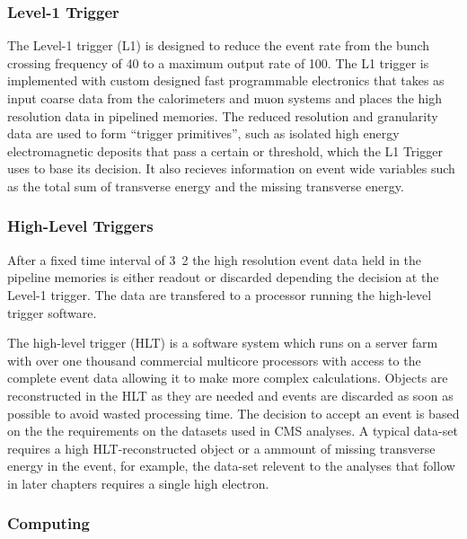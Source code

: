 \subsubsection{Level-1 Trigger}

The Level-1 trigger (L1) is designed to reduce the event rate from the bunch
crossing frequency of \unit{40}{\mega\hertz} to a maximum output rate of
\unit{100}{\kilo\hertz}.
The L1 trigger is implemented with custom designed fast programmable electronics
 that takes as input coarse data from the calorimeters and muon systems and
places the high resolution data in pipelined memories. The reduced resolution
and granularity data are used to form ``trigger primitives'', such as isolated
high energy electromagnetic deposits that pass a certain \PT or \ET threshold,
which the L1 Trigger uses to base its decision. It also recieves information on
event wide variables such as the total sum of transverse energy and the missing
transverse energy.

\subsubsection{High-Level Triggers}
After a fixed time interval of \unit{3.2}{\micro\second} the high resolution
event data held in the pipeline memories is either readout or discarded
depending the decision at the Level-1 trigger.  The data are transfered to a
processor running the high-level trigger software.

The high-level trigger (HLT) is a software system which runs on a server farm with
over one thousand commercial multicore processors with access to the complete
event data allowing it to make more complex calculations. 
Objects are reconstructed in the HLT as they are needed and events are discarded
as soon as possible to avoid wasted processing time.
The decision to accept an event is based on the the requirements on the datasets
used in \ac{CMS} analyses. A typical data-set requires a high \pT
HLT-reconstructed object or a ammount of missing transverse energy in the event,
for example, the data-set relevent to the analyses that follow in later chapters
requires a single high \pT electron.

\subsubsection{Computing}

